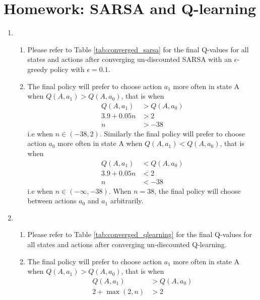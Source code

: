 \documentclass{article}
\begin{document}
\section*{Homework: SARSA and Q-learning}
\begin{enumerate}
	\item \begin{enumerate}
		      \item Please refer to Table \ref{tab:converged_sarsa} for the final Q-values for all
		            states and actions after converging un-discounted SARSA with an $\epsilon$-greedy
		            policy with $\epsilon=0.1$.
		      \item The final policy will prefer to choose action $a_1$ more often in state A when $Q(A,
			            a_1) > Q(A, a_0)$, that is when
		            \begin{align*}
			            Q(A,a_1)    & > Q(A, a_0) \\
			            3.9 + 0.05n & > 2         \\
			            n           & > -38
		            \end{align*}
		            i.e when $n \in (-38, 2)$. Similarly the final policy will prefer to choose action
		            $a_0$ more often in state A when $Q(A,
			            a_1) < Q(A, a_0)$, that is when
		            \begin{align*}
			            Q(A,a_1)    & < Q(A, a_0) \\
			            3.9 + 0.05n & < 2         \\
			            n           & < -38
		            \end{align*}
		            i.e when $n \in (-\infty, -38)$. When $n = 38$, the final policy will choose between
		            actions $a_0$ and $a_1$ arbitrarily.
	      \end{enumerate}
	\item \begin{enumerate}
		      \item Please refer to Table \ref{tab:converged_qlearning} for the final Q-values for all
		            states and actions after converging un-discounted Q-learning.
		      \item The final policy will prefer to choose action $a_1$ more often in state A when $Q(A,
			            a_1) > Q(A, a_0)$, that is when
		            \begin{align*}
			            Q(A,a_1)       & > Q(A, a_0) \\
			            2 + \max(2, n) & > 2         \\

\end{align*}
\end{enumerate}
\end{enumerate}
\end{document}
